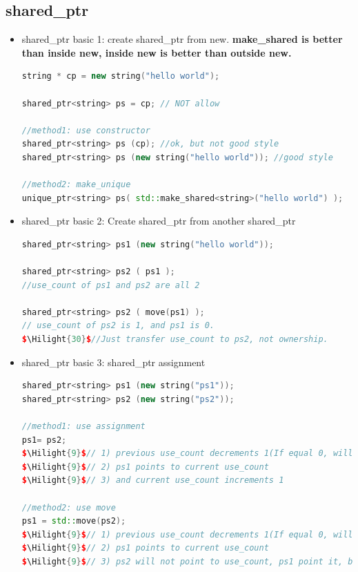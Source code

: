 \documentclass[a4paper,12pt,twoside]{book}
\newcommand{\Hilight}[1]{\makebox[0pt][l]{\color{yellow}\rule[-3pt]{#1em}{11pt}}}
\begin{document}
\subsection{shared\_ptr}
\begin{itemize}

\item shared\_ptr basic 1: create shared\_ptr from new.    \textbf{make\_shared is better than inside new, inside new is better than outside new.}
\begin{lstlisting}[frame=single, language=c++]
string * cp = new string("hello world");

shared_ptr<string> ps = cp; // NOT allow

//method1: use constructor
shared_ptr<string> ps (cp); //ok, but not good style
shared_ptr<string> ps (new string("hello world")); //good style

//method2: make_unique
unique_ptr<string> ps( std::make_shared<string>("hello world") );
\end{lstlisting}

\item shared\_ptr basic 2: Create shared\_ptr from another shared\_ptr
\begin{lstlisting}[frame=single, language=c++, mathescape=true]
shared_ptr<string> ps1 (new string("hello world"));

shared_ptr<string> ps2 ( ps1 );
//use_count of ps1 and ps2 are all 2

shared_ptr<string> ps2 ( move(ps1) );
// use_count of ps2 is 1, and ps1 is 0.
$\Hilight{30}$//Just transfer use_count to ps2, not ownership.
\end{lstlisting}

\item shared\_ptr basic 3: shared\_ptr assignment
\begin{lstlisting}[frame=single, language=c++, mathescape=true]
shared_ptr<string> ps1 (new string("ps1"));
shared_ptr<string> ps2 (new string("ps2"));

//method1: use assignment
ps1= ps2;
$\Hilight{9}$// 1) previous use_count decrements 1(If equal 0, will delete)
$\Hilight{9}$// 2) ps1 points to current use_count
$\Hilight{9}$// 3) and current use_count increments 1

//method2: use move
ps1 = std::move(ps2);
$\Hilight{9}$// 1) previous use_count decrements 1(If equal 0, will delete)
$\Hilight{9}$// 2) ps1 points to current use_count
$\Hilight{9}$// 3) ps2 will not point to use_count, ps1 point it, but NOT increment 1



\end{lstlisting}
\end{itemize}
\end{document}
